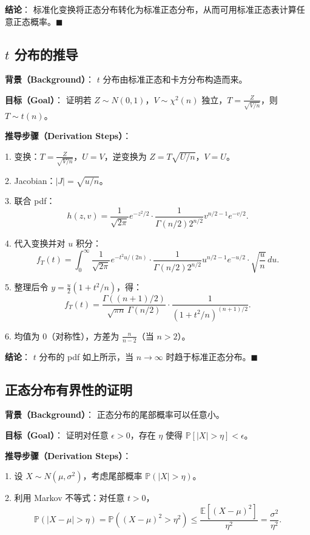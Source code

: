 \textbf{结论}：
标准化变换将正态分布转化为标准正态分布，从而可用标准正态表计算任意正态概率。$\blacksquare$

\subsection{$t$ 分布的推导}\label{sec:t-distribution-derivation}

\textbf{背景（Background）}：
$t$ 分布由标准正态和卡方分布构造而来。

\textbf{目标（Goal）}：
证明若 $Z \sim N(0,1)$，$V \sim \chi^2(n)$ 独立，$T = \frac{Z}{\sqrt{V/n}}$，则 $T \sim t(n)$。

\textbf{推导步骤（Derivation Steps）}：

1. 变换：$T = \frac{Z}{\sqrt{V/n}}$，$U = V$，逆变换为 $Z = T\sqrt{U/n}$，$V = U$。

2. Jacobian：$|J| = \sqrt{u/n}$。

3. 联合 pdf：
\[
h(z, v) = \frac{1}{\sqrt{2\pi}} e^{-z^2/2} \cdot \frac{1}{\Gamma(n/2)2^{n/2}} v^{n/2-1} e^{-v/2}.
\]

4. 代入变换并对 $u$ 积分：
\[
f_T(t) = \int_0^\infty \frac{1}{\sqrt{2\pi}} e^{-t^2 u/(2n)} \cdot \frac{1}{\Gamma(n/2)2^{n/2}} u^{n/2-1} e^{-u/2} \cdot \sqrt{\frac{u}{n}} \, du.
\]

5. 整理后令 $y = \frac{u}{2}(1 + t^2/n)$，得：
\[
f_T(t) = \frac{\Gamma((n+1)/2)}{\sqrt{\pi n} \, \Gamma(n/2)} \cdot \frac{1}{(1 + t^2/n)^{(n+1)/2}}.
\]

6. 均值为 0（对称性），方差为 $\frac{n}{n-2}$（当 $n > 2$）。

\textbf{结论}：
$t$ 分布的 pdf 如上所示，当 $n \to \infty$ 时趋于标准正态分布。$\blacksquare$

\subsection{正态分布有界性的证明}\label{sec:normal-bounded}

\textbf{背景（Background）}：
正态分布的尾部概率可以任意小。

\textbf{目标（Goal）}：
证明对任意 $\epsilon > 0$，存在 $\eta$ 使得 $\mathbb{P}[|X| > \eta] < \epsilon$。

\textbf{推导步骤（Derivation Steps）}：

1. 设 $X \sim N(\mu, \sigma^2)$，考虑尾部概率 $\mathbb{P}(|X| > \eta)$。

2. 利用 Markov 不等式：对任意 $t > 0$，
\[
\mathbb{P}(|X - \mu| > \eta) = \mathbb{P}((X - \mu)^2 > \eta^2) \leq \frac{\mathbb{E}[(X - \mu)^2]}{\eta^2} = \frac{\sigma^2}{\eta^2}.
\]

